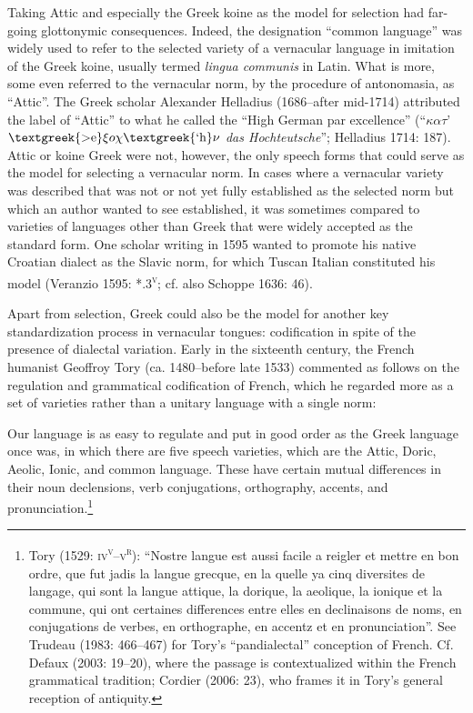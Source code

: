 \begin{styleStandard}
Taking Attic and especially the Greek koine as the model for selection had far-going glottonymic consequences. Indeed, the designation “common language” was widely used to refer to the selected variety of a vernacular language in imitation of the Greek koine, usually termed \textit{lingua communis} in Latin. What is more, some even referred to the vernacular norm, by the procedure of antonomasia, as “Attic”. The Greek scholar Alexander Helladius (1686–after mid-1714) attributed the label of “Attic” to what he called the “High German par excellence” (“$\kappa \alpha \tau $’ $\text{\textgreek{>e}}\xi o\chi \text{\textgreek{`h}}\nu $ \textit{das Hochteutsche}”; Helladius 1714: 187). Attic or koine Greek were not, however, the only speech forms that could serve as the model for selecting a vernacular norm. In cases where a vernacular variety was described that was not or not yet fully established as the selected norm but which an author wanted to see established, it was sometimes compared to varieties of languages other than Greek that were widely accepted as the standard form. One scholar writing in 1595 wanted to promote his native Croatian dialect as the Slavic norm, for which Tuscan Italian constituted his model (Veranzio 1595: *.3\textsc{\textsuperscript{v}}; cf. also Schoppe 1636: 46).
\end{styleStandard}

\begin{styleStandard}
Apart from selection, Greek could also be the model for another key standardization process in vernacular tongues: codification in spite of the presence of dialectal variation. Early in the sixteenth century, the French humanist Geoffroy Tory (ca. 1480–before late 1533) commented as follows on the regulation and grammatical codification of French, which he regarded more as a set of varieties rather than a unitary language with a single norm:
\end{styleStandard}

\begin{styleQuote}
Our language is as easy to regulate and put in good order as the Greek language once was, in which there are five speech varieties, which are the Attic, Doric, Aeolic, Ionic, and common language. These have certain mutual differences in their noun declensions, verb conjugations, orthography, accents, and pronunciation.\footnote{ Tory (1529: \textsc{iv}\textsc{\textsuperscript{v}}\textsc{–v}\textsc{\textsuperscript{r}}): “Nostre langue est aussi facile a reigler et mettre en bon ordre, que fut jadis la langue grecque, en la quelle ya cinq diversites de langage, qui sont la langue attique, la dorique, la aeolique, la ionique et la commune, qui ont certaines differences entre elles en declinaisons de noms, en conjugations de verbes, en orthographe, en accentz et en pronunciation”. See Trudeau (1983: 466–467) for Tory’s “pandialectal” conception of French. Cf. Defaux (2003: 19–20), where the passage is contextualized within the French grammatical tradition; Cordier (2006: 23), who frames it in Tory’s general reception of antiquity.}
\end{styleQuote}

